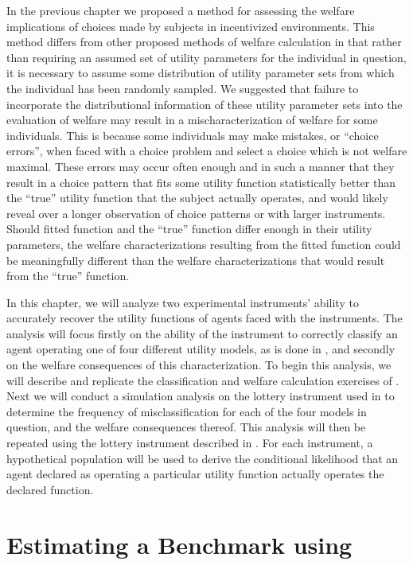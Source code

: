 \documentclass[11pt,a4paper]{report}
\begin{document}
In the previous chapter we proposed a method for assessing the welfare implications of choices made by subjects in incentivized environments.
This method differs from other proposed methods of welfare calculation in that rather than requiring an assumed set of utility parameters for the individual in question, it is necessary to assume some distribution of utility parameter sets from which the individual has been randomly sampled.
We suggested that failure to incorporate the distributional information of these utility parameter sets into the evaluation of welfare may result in a mischaracterization of welfare for some individuals.
This is because some individuals may make mistakes, or \enquote{choice errors}, when faced with a choice problem and select a choice which is not welfare maximal.
These errors may occur often enough and in such a manner that they result in a choice pattern that fits some utility function statistically better than the \enquote{true} utility function that the subject actually operates, and would likely reveal over a longer observation of choice patterns or with larger instruments.
Should fitted function and the \enquote{true} function differ enough in their utility parameters, the welfare characterizations resulting from the fitted function could be meaningfully different than the welfare characterizations that would result from the \enquote{true} function.

In this chapter, we will analyze two experimental instruments' ability to accurately recover the utility functions of agents faced with the instruments.
The analysis will focus firstly on the ability of the instrument to correctly classify an agent operating one of four different utility models, as is done in \textcite{Harrison2016}, and secondly on the welfare consequences of this characterization.
To begin this analysis, we will describe and replicate the classification and welfare calculation exercises of \textcite{Harrison2016}.
Next we will conduct a simulation analysis on the lottery instrument used in \textcite{Harrison2016} to determine the frequency of misclassification for each of the four models in question, and the welfare consequences thereof.
This analysis will then be repeated using the lottery instrument described in \textcite{Hey1994}.
For each instrument, a hypothetical population will be used to derive the conditional likelihood that an agent declared as operating a particular utility function actually operates the declared function.

\section{Estimating a Benchmark using \texorpdfstring{\textcite{Harrison2016}}{Harrison and Ng (2015)}}
\end{document}
